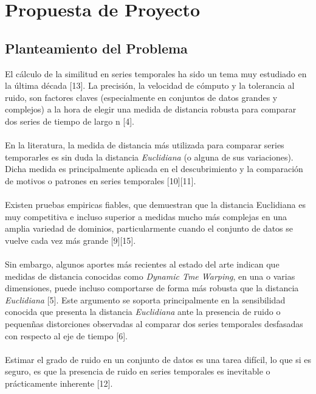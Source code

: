 \section{\textbf{Propuesta de Proyecto}}
\subsection{Planteamiento del Problema}
El c\'alculo de la similitud en series temporales ha sido un tema muy estudiado en la \'ultima d\'ecada [13]. La precisi\'on, la velocidad de c\'omputo y la tolerancia al ruido, son factores claves (especialmente en conjuntos de datos grandes y complejos) a la hora de elegir una medida de distancia robusta para comparar dos series de tiempo de largo n [4].\\\\
En la literatura, la medida de distancia m\'as utilizada para comparar series temporarles es sin duda la distancia \textit{Euclidiana} (o alguna de sus variaciones). Dicha medida es principalmente aplicada en el descubrimiento y la comparaci\'on de motivos o patrones en series temporales [10][11].\\\\
Existen pruebas empiricas fiables, que demuestran que la distancia Euclidiana es muy competitiva e incluso superior a medidas mucho m\'as complejas en una amplia variedad de dominios, particularmente cuando el conjunto de datos se vuelve cada vez m\'as grande [9][15].\\\\
Sin embargo, algunos aportes m\'as recientes al estado del arte indican que medidas de distancia conocidas como \textit{Dynamic Tme Warping}, en una o varias dimensiones, puede incluso comportarse de forma m\'as robusta que la distancia \textit{Euclidiana} [5]. Este argumento se soporta principalmente en la sensibilidad conocida que presenta la distancia \textit{Euclidiana} ante la presencia de ruido o pequen\~nas distorciones observadas al comparar dos series temporales desfasadas con respecto al eje de tiempo [6].\\\\
Estimar el grado de ruido en un conjunto de datos es una tarea dif\'icil, lo que si es seguro, es que la presencia de ruido en series temporales es inevitable o pr\'acticamente inherente [12].\\\\
